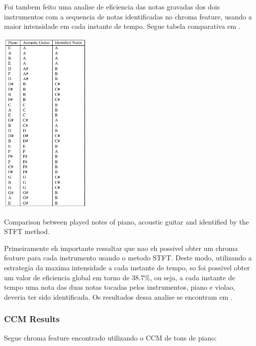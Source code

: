 \documentclass{article}
\begin{document}
	Foi tambem feito uma analise de eficiencia das notas gravadas dos dois instrumentos com a sequencia de notas identificadas no chroma feature, usando a maior intensidade em cada instante de tempo. Segue tabela comparativa em .

	\begin{table}[h]
	 \begin{center}
	 	\centerline{
	 \includegraphics[width=\columnwidth,height=9cm]{figs/tabela_2.png}}
	 \end{center}
	 \caption{Comparison between played notes of piano, acoustic guitar and identified by the STFT method.}
	 \label{tab:table-2-sfft}
	\end{table}


	\newpage

	Primeiramente eh importante ressaltar que nao eh possivel obter um chroma feature para cada instrumento usando o metodo STFT. Deste modo, utilizando a estrategia da maxima intensidade a cada instante de tempo, so foi possivel obter um valor de eficiencia global em torno de 38.7\%, ou seja, a cada instante de tempo uma nota das duas notas tocadas pelos instrumentos, piano e violao, deveria ter sido identificada. Os resultados dessa analise se encontram em .

	\subsubsection{CCM Results}
	Segue chroma feature encontrado utilizando o CCM de tons de piano:
	
\end{document}
